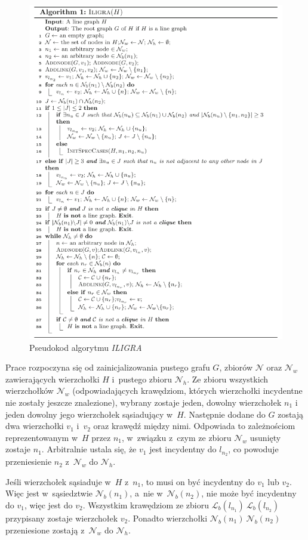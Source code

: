 \documentclass{article}
\begin{document}
\begin{figure}[h!]
	\includegraphics[width=\linewidth]{algo.png}
	\caption{Pseudokod algorytmu \textit{ILIGRA}}
	\label{fig:algo}
\end{figure}

Prace rozpoczyna się od zainicjalizowania pustego grafu $G$, zbiorów $\mathcal{N}$ oraz $\mathcal{N}_w$ zawierających wierzchołki $H$ i~pustego zbioru $\mathcal{N}_h$. Ze zbioru wszystkich wierzchołków $\mathcal{N}_w$ (odpowiadających krawędziom, których wierzchołki incydentne nie zostały jeszcze znalezione), wybrany zostaje jeden, dowolny wierzchołek $n_1$ i jeden dowolny jego wierzchołek sąsiadujący w~$H$. Następnie dodane do $G$ zostają dwa wierzchołki $v_1$ i~$v_2$ oraz krawędź między nimi. Odpowiada to zależnościom reprezentowanym w~$H$ przez $n_1$, w~związku z~czym ze zbioru $\mathcal{N}_w$ usunięty zostaje $n_1$. Arbitralnie ustala się, że $v_1$ jest incydentny do $l_{n_2}$, co powoduje przeniesienie $n_2$ z~$\mathcal{N}_w$ do $\mathcal{N}_h$.

Jeśli wierzchołek sąsiaduje w~$H$ z~$n_1$, to musi on być incydentny do $v_1$ lub $v_2$. Więc jest w~sąsiedztwie $\mathcal{N}_b(n_1)$, a~nie w~$\mathcal{N}_b(n_2)$, nie może być incydentny do $v_1$, więc jest do $v_2$. Wszystkim krawędziom ze zbioru $\mathcal{L}_b(l_{n_1})\ \mathcal{L}_b(l_{n_2})$ przypisany zostaje wierzchołek $v_2$. Ponadto wierzchołki $\mathcal{N}_b(n_1)\ \mathcal{N}_b(n_2)$ przeniesione zostają z~$\mathcal{N}_w$ do $\mathcal{N}_h$.


 

\end{document}
